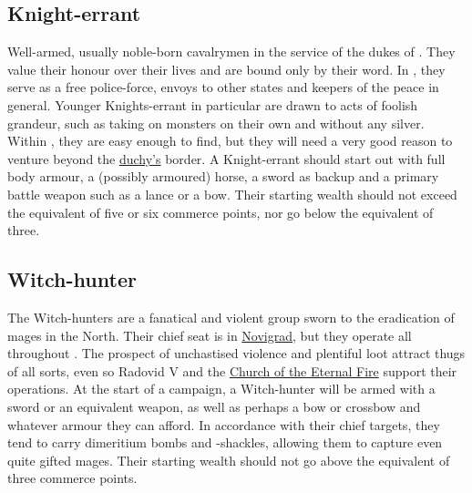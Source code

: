 \documentclass[parskip=full,11pt,%
footheight=38pt]{scrreport}
\begin{document}
\subsection{Knight-errant}\label{profession:knight_errant}
Well-armed, usually noble-born cavalrymen in the service of the dukes of . They value their honour over their lives and are
bound only by their word. In , they serve as a free police-force, envoys to other states and keepers of the peace in general.
Younger Knights-errant in particular are drawn to acts of foolish grandeur, such as taking on monsters on their own and without any silver. Within
, they are easy enough to find, but they will need a very good reason to venture beyond the \hyperref[realm:toussaint]{duchy's} border.
A Knight-errant should start out with full body armour, a (possibly armoured) horse, a sword as backup and a primary battle weapon such as a lance or
a bow. Their starting wealth should not exceed the equivalent of five or six commerce points, nor go below the equivalent of three.

\subsection{Witch-hunter}\label{profession:witch_hunters}
The Witch-hunters are a fanatical and violent group sworn to the eradication of mages in the North.
Their chief seat is in \hyperref[city:novigrad]{Novigrad}, but they operate all throughout .
The prospect of unchastised violence and plentiful loot attract thugs of all sorts, even so Radovid V and the
\hyperref[religion:eternal_fire]{Church of the Eternal Fire} support their operations.
At the start of a campaign, a Witch-hunter will be armed with a sword or an equivalent weapon, as well as perhaps a 
bow or crossbow and whatever armour they can afford. In accordance with their chief targets, they tend to carry dimeritium
bombs and -shackles, allowing them to capture even quite gifted mages. Their starting wealth should not go above the equivalent
of three commerce points.
\end{document}
